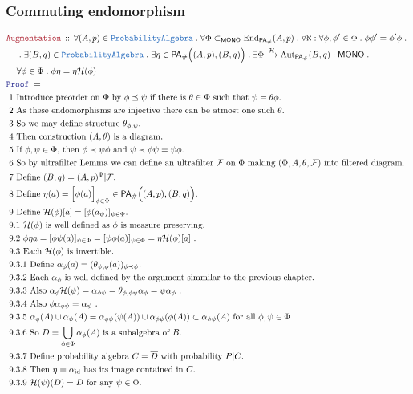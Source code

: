 \documentclass[12pt]{scrartcl}
\newcommand{\TYPE}[1]{\textcolor{NavyBlue}{\mathtt{#1}}}
\newcommand{\LOGIC}[1]{\textcolor{Blue}{\mathtt{#1}}}
\newcommand{\THM}[1]{\textcolor{Maroon}{\mathtt{#1}}}
\renewcommand{\.}{\; . \;}
\newcommand{\Theorem}[2]{& \THM{#1} \, :: \, #2 \\ & \Proof = \\ }
\newcommand{\NewLine}{\\ & \kern 1pc}
\newcommand{\Page}[1]{ \begin{align*} #1 \end{align*}   }
\DeclareMathOperator*{\id}{id}
\newcommand{\End}{\mathrm{End}}
\newcommand{\Aut}{\mathrm{Aut}}
\newcommand{\Arrow}{\xrightarrow}
\newcommand{\Proof}{\LOGIC{Proof} \; }
\newcommand{\Explain}[1]{& \text{#1.} \\}
\newcommand{\F}{\mathcal{F}}
\newcommand{\PAlg}{\TYPE{ProbabilityAlgebra}}
\newcommand{\pa}{\mathsf{PA}}
\begin{document}
\subsubsection{Commuting endomorphism}
\Page{
	\Theorem{Augmentation}{
		\forall (A,p) \in \PAlg \.
		\forall \Phi \subset_{\mathsf{MONO}} \End_{\pa_\#}(A,p) \.
		\forall \aleph : \forall \phi,\phi' \in \Phi \. \phi \phi' = \phi' \phi \. \NewLine \.
		\exists (B,q) \in \PAlg \.
		\exists \eta  \in \pa_\#\Big( (A,p), (B,q)\Big) \. 
		\exists  \Phi \Arrow{\mathcal{H}} \Aut_{\pa_\#}(B,q) : \mathsf{MONO} \. \NewLine
		\forall \phi \in \Phi \.   \phi \eta = \eta \mathcal{H}(\phi)
	}
	\Explain{ 1 Introduce preorder on $\Phi$ by
		$\phi \preceq \psi$ if there is $\theta \in \Phi$ such that $\psi = \theta \phi$} 
	\Explain{ 2 As these endomorphisms are injective there can be atmost one such $\theta$}
	\Explain{ 3 So we may define structure $\theta_{\phi,\psi}$}
	\Explain{ 4 Then construction $(A,\theta)$ is a diagram}
	\Explain{ 5 If $\phi,\psi \in \Phi$, then $\phi \prec \psi \phi$ and $\psi \prec \phi \psi = \psi \phi$}
	\Explain{ 6 So by ultrafilter Lemma we can define an ultrafilter $\F$ on $\Phi$ 
		making $(\Phi,A,\theta,\F)$ into filtered diagram}
	\Explain{ 7 Define $(B,q) = (A,p)^\Phi|\F$}
	\Explain{ 8 Define $\eta(a) =   \Big[\phi(a)\Big]_{\phi \in \Phi} \in \pa_\#\Big( (A,p), (B,q)\Big)$}
	\Explain{ 9 Define $\mathcal{H}(\phi)[a] = [\phi(a_\psi)]_{\psi \in \Phi }$}
	\Explain{ 9.1 $\mathcal{H}(\phi)$ is well defined as $\phi$ is measure preserving}
	\Explain{ 9.2        
		$ \phi \eta a   = 
		  [\phi \psi(a)]_{\psi \in \Phi} =  
		  [\psi \phi(a)]_{\psi \in \Phi} = 
		  \eta \mathcal{H}(\phi) [a] 		
		$	
	}
	\Explain{ 9.3 Each $\mathcal{H}(\phi)$ is invertible}
	\Explain{ 9.3.1 Define $\alpha_\phi(a) = (\theta_{\psi,\phi}(a))_{\phi \prec \psi}$}
	\Explain{ 9.3.2 Each $\alpha_\phi$ is well defined by the argument simmilar to the previous chapter}
	\Explain{ 9.3.3 Also $\alpha_\phi \mathcal{H}(\psi) = \alpha_{\phi \psi} 
		= \theta_{\phi,\phi\psi} \alpha_\phi = \psi \alpha_\phi$ }
	\Explain{	 9.3.4 Also $ \phi \alpha_{\phi \psi} = \alpha_\psi$ }
	\Explain{ 9.3.5  $\alpha_\phi(A) \cup \alpha_\psi(A) =
		\alpha_{\phi\psi}(\psi(A)) \cup \alpha_{\phi\psi}(\phi(A)) \subset
		\alpha_{\phi\psi}(A)		
		$  for all $\phi,\psi \in \Phi$}
	\Explain{ 9.3.6 So $D = \bigcup_{\phi \in \Phi} \alpha_\phi(A)$ is a subalgebra of $B$} 
	\Explain{ 9.3.7 Define probability algebra $C = \overline{D}$ with probability $P|C$}
	\Explain{ 9.3.8 Then $\eta = \alpha_{\id}$ has its image contained in $C$}
	\Explain{ 9.3.9 $\mathcal{H}(\psi)(D) = D$ for any $\psi \in \Phi$}	
}
\end{document}
